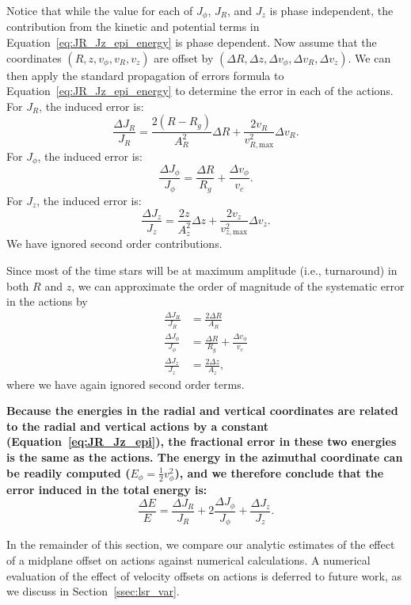 \documentclass[twocolumn]{aastex62}
\newcommand{\beq}{\begin{equation}}
\newcommand{\eeq}{\end{equation}}
\begin{document}
Notice that while the value for each of $J_{\phi}$, $J_R$, and $J_z$ is phase
independent, the contribution from the kinetic and potential terms in
Equation~\eqref{eq:JR_Jz_epi_energy} is phase dependent. Now assume that the
coordinates $(R, z, v_{\phi}, v_R, v_z)$ are offset by $(\Delta R, \Delta z,
\Delta v_{\phi}, \Delta v_R, \Delta v_z)$. We can then apply the standard
propagation of errors formula to Equation~\eqref{eq:JR_Jz_epi_energy} to
determine the error in each of the actions. 
For $J_R$, the induced error is:
\beq\label{eq:induced_JR}
\frac{\Delta J_R}{J_R} = \frac{2(R-R_g)}{A_R^2}\Delta R
                         + \frac{2v_R}{v_{R,\text{max}}^2} \Delta v_R \text{.}
\eeq
For $J_{\phi}$, the induced error
is:
\beq\label{eq:induced_Jphi}
\frac{\Delta J_{\phi}}{J_{\phi}} = \frac{\Delta R}{R_g}
                                    + \frac{\Delta v_{\phi}}{v_c}\text{.}
\eeq
For $J_z$, the induced error is:
\beq\label{eq:induced_Jz}
\frac{\Delta J_z}{J_z} = \frac{2z}{A_z^2}\Delta z
                         + \frac{2v_z}{v_{z,\text{max}}^2} \Delta v_z \text{.}
\eeq
We have ignored second order contributions.

Since most of the time stars will be at maximum amplitude (i.e., turnaround)
in both $R$ and $z$, we can approximate the order of magnitude of the
systematic error in the actions by
\beq\label{eq:Ji_err_mosttime}
\begin{split}
\frac{\Delta J_{R}}{J_{R}} &= \frac{2\Delta R}{A_R} \\
\frac{\Delta J_{\phi}}{J_{\phi}} &= \frac{\Delta R}{R_g}
                                    + \frac{\Delta v_{\phi}}{v_c} \\
\frac{\Delta J_{z}}{J_{z}} &= \frac{2\Delta z}{A_z} \text{,}
\end{split}
\eeq
where we have again ignored second order terms.

\textbf{Because the energies in the radial and vertical coordinates are
related to the radial and vertical actions by a constant
(Equation~\eqref{eq:JR_Jz_epi}), the fractional error in these two energies is
the same as the actions. The energy in the azimuthal coordinate can be readily
computed ($E_{\phi} = \frac{1}{2}v_{\phi}^2$), and we therefore conclude that
the error induced in the total energy is:
\beq\label{eq:error_total_energy}
\frac{\Delta E}{E} = \frac{\Delta J_R}{J_R} + 2\frac{\Delta J_{\phi}}{J_{\phi}}
                     + \frac{\Delta J_z}{J_z}\text{.}
\eeq}

In the remainder of this section, we compare our analytic estimates of the
effect of a midplane offset on actions against numerical calculations. A
numerical evaluation of the effect of velocity offsets on actions is deferred
to future work, as we discuss in Section~\ref{ssec:lsr_var}.
\end{document}
